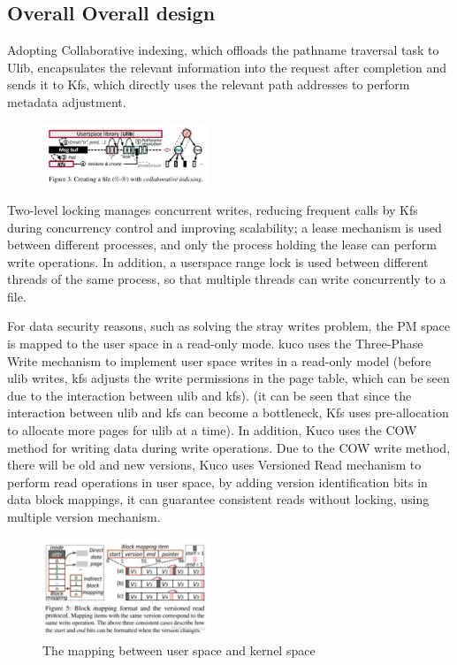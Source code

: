 \documentclass[acmtog]{acmart}
\begin{document}
\subsection{Overall Overall design}


Adopting Collaborative indexing, which offloads the pathname traversal task to Ulib, encapsulates the relevant information into the request after completion and sends it to Kfs, which directly uses the relevant path addresses to perform metadata adjustment.
\begin{figure}[htbp]
  \centering
  \includegraphics[width=5cm]{./lib.png}
\end{figure}
Two-level locking manages concurrent writes, reducing frequent calls by Kfs during concurrency control and improving scalability; a lease mechanism is used between different processes, and only the process holding the lease can perform write operations. In addition, a userspace range lock is used between different threads of the same process, so that multiple threads can write concurrently to a file.

For data security reasons, such as solving the stray writes problem, the PM space is mapped to the user space in a read-only mode. kuco uses the Three-Phase Write mechanism to implement user space writes in a read-only model (before ulib writes, kfs adjusts the write permissions in the page table, which can be seen due to the interaction between ulib and kfs). (it can be seen that since the interaction between ulib and kfs can become a bottleneck, Kfs uses pre-allocation to allocate more pages for ulib at a time). In addition, Kuco uses the COW method for writing data during write operations.
Due to the COW write method, there will be old and new versions, Kuco uses Versioned Read mechanism to perform read operations in user space, by adding version identification bits in data block mappings, it can guarantee consistent reads without locking, using multiple version mechanism.


\begin{figure}[htbp]
  \centering
  \includegraphics[width=5cm]{./map.png}
  \caption{The mapping between user space and kernel space}
\end{figure}
\end{document}
